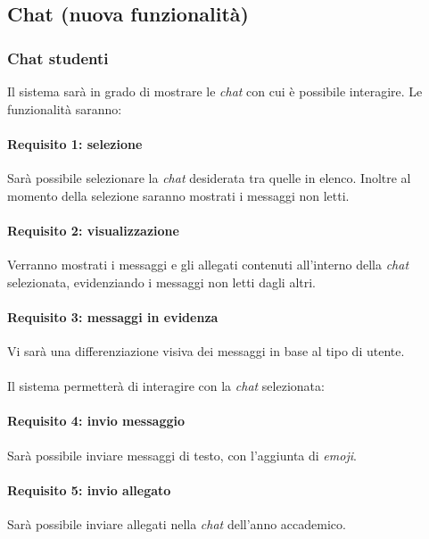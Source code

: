 \subsection{Chat (nuova funzionalità)}
\subsubsection{Chat studenti}
Il sistema sarà in grado di mostrare le \emph{chat} con cui è possibile interagire. Le funzionalità saranno:

\paragraph{Requisito 1: selezione\\}
Sarà possibile selezionare la \emph{chat} desiderata tra quelle in elenco. Inoltre al momento della selezione saranno mostrati i messaggi non letti.


\paragraph{Requisito 2: visualizzazione\\}
Verranno mostrati i messaggi e gli allegati contenuti all’interno della \emph{chat} selezionata, evidenziando i messaggi non letti dagli altri.

\paragraph{Requisito 3: messaggi in evidenza\\}
Vi sarà una differenziazione visiva dei messaggi in base al tipo di utente.\\
\\
Il sistema permetterà di interagire con la \emph{chat} selezionata:

\paragraph{Requisito 4: invio messaggio\\}
Sarà possibile inviare messaggi di testo, con l’aggiunta di \emph{emoji}.

\paragraph{Requisito 5: invio allegato\\}
Sarà possibile inviare allegati nella \emph{chat} dell’anno accademico.

